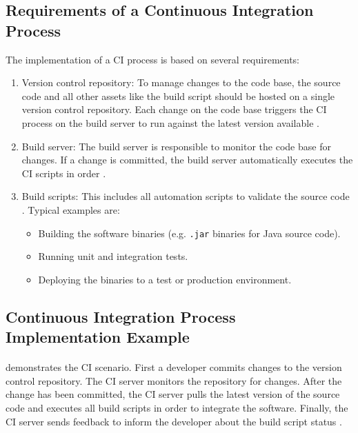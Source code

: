 \subsection{Requirements of a Continuous Integration Process}
\label{sec:02_depl-pipeline_requirements}
The implementation of a CI process is based on several requirements:
\begin{enumerate}
\item Version control repository:
To manage changes to the code base, the source code and all other assets like the build script should be hosted on a single version control repository.
Each change on the code base triggers the CI process on the build server to run against the latest version available \cite{Duvall2007CI}.

\item Build server:
The build server is responsible to monitor the code base for changes.
If a change is committed, the build server automatically executes the CI scripts in order \cite{Rossel2017CICD, Duvall2007CI}.

\item Build scripts:
This includes all automation scripts to validate the source code \cite{Duvall2007CI}. Typical examples are:
\begin{itemize}
\item Building the software binaries (e.g. \texttt{.jar} binaries for Java source code).
\item Running unit and integration tests.
\item Deploying the binaries to a test or production environment.
\end{itemize}
\end{enumerate}


\subsection{Continuous Integration Process Implementation Example}
\paragraph{} demonstrates the CI scenario.
First a developer commits changes to the version control repository.
The CI server monitors the repository for changes. After the change has been committed, the CI server pulls the latest version of the source code and executes all build scripts in order to integrate the software.
Finally, the CI server sends feedback to inform the developer about the build script status  \cite{Duvall2007CI}.


